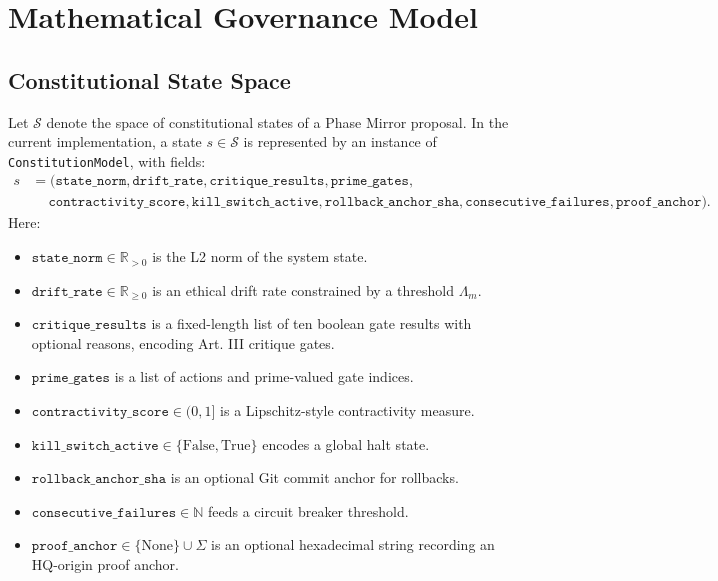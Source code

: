 \documentclass[11pt]{article}
\begin{document}

\section{Mathematical Governance Model}

\subsection{Constitutional State Space}

Let \(\mathcal{S}\) denote the space of constitutional states of a Phase Mirror proposal. In the current implementation, a state \(s \in \mathcal{S}\) is represented by an instance of \texttt{ConstitutionModel}, with fields:\cite{cite:40,cite:41}
\begin{align*}
  s &= \bigl(
    \texttt{state\_norm},
    \texttt{drift\_rate},
    \texttt{critique\_results},
    \texttt{prime\_gates},\\
    &\quad\ \texttt{contractivity\_score},
    \texttt{kill\_switch\_active},
    \texttt{rollback\_anchor\_sha},
    \texttt{consecutive\_failures},
    \texttt{proof\_anchor}
  \bigr).
\end{align*}
Here:
\begin{itemize}[nosep]
  \item \(\texttt{state\_norm} \in \mathbb{R}_{>0}\) is the L2 norm of the system state.\cite{cite:40}
  \item \(\texttt{drift\_rate} \in \mathbb{R}_{\ge 0}\) is an ethical drift rate constrained by a threshold \(\Lambda_m\).\cite{cite:40}
  \item \(\texttt{critique\_results}\) is a fixed-length list of ten boolean gate results with optional reasons, encoding Art. III critique gates.\cite{cite:40}
  \item \(\texttt{prime\_gates}\) is a list of actions and prime-valued gate indices.\cite{cite:40}
  \item \(\texttt{contractivity\_score}\in(0,1]\) is a Lipschitz-style contractivity measure.\cite{cite:40}
  \item \(\texttt{kill\_switch\_active}\in\{\mathrm{False},\mathrm{True}\}\) encodes a global halt state.\cite{cite:40}
  \item \(\texttt{rollback\_anchor\_sha}\) is an optional Git commit anchor for rollbacks.\cite{cite:40}
  \item \(\texttt{consecutive\_failures} \in \mathbb{N}\) feeds a circuit breaker threshold.\cite{cite:40}
  \item \(\texttt{proof\_anchor}\in\{\text{None}\}\cup\Sigma\) is an optional hexadecimal string recording an HQ-origin proof anchor.\cite{cite:41}
\end{itemize}
\end{document}
